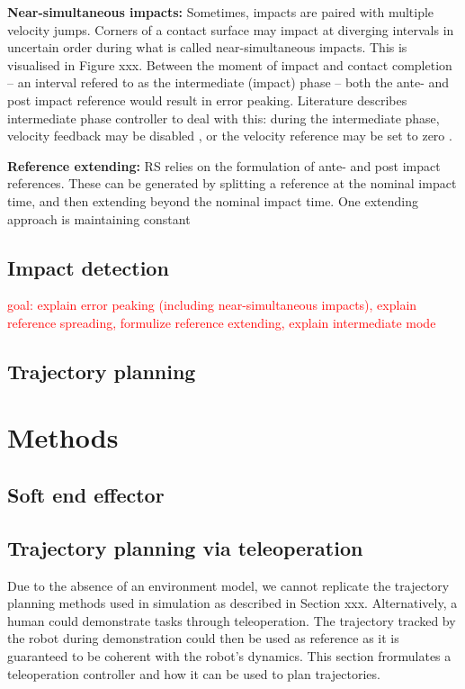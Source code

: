 \documentclass[a4paper, 10pt, conference]{ieeeconf}
\begin{document}
   \textbf{Near-simultaneous impacts:} Sometimes, impacts are paired with multiple velocity jumps.  Corners of a contact surface may impact at diverging intervals in uncertain order during what is called near-simultaneous impacts. This is visualised in Figure xxx. Between the moment of impact and contact completion -- an interval refered to as the intermediate (impact) phase -- both the ante- and post impact reference would result in error peaking. Literature describes intermediate phase controller to deal with this: during the intermediate phase, velocity feedback may be disabled \cite{vansteenRobotControlSimultaneous2021}, or the velocity reference may be set to zero \cite{uitendaalTeachingRobotsInteraction2022}. 

   \textbf{Reference extending:} RS relies on the formulation of  ante- and post impact references. These can be generated by splitting a reference at the nominal impact time, and then extending beyond the nominal impact time. One extending approach is maintaining constant 
    \subsection{Impact detection}
    \textcolor{red}{goal: explain error peaking (including near-simultaneous impacts), explain reference spreading, formulize reference extending, explain intermediate mode}\\
    \subsection{Trajectory planning}

    \section{Methods}
    \subsection{Soft end effector}
    \subsection{Trajectory planning via teleoperation}
    Due to the absence of an environment model, we cannot replicate the trajectory planning methods used in simulation as described in Section xxx. Alternatively, a human could demonstrate tasks through teleoperation. The trajectory tracked by the robot during demonstration could then be used as reference as it is guaranteed to be coherent with the robot's dynamics. This section frormulates a teleoperation controller and how it can be used to plan trajectories.
\end{document}
